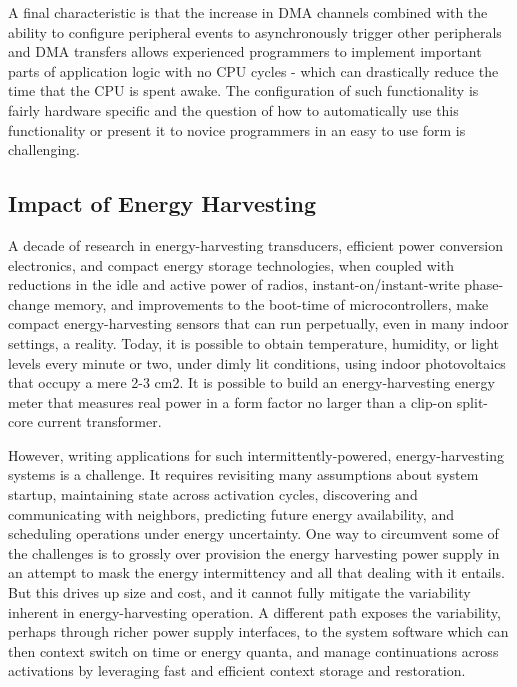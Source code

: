 A final characteristic is that the increase in DMA channels combined with the
ability to configure peripheral events to asynchronously trigger other
peripherals and DMA transfers allows experienced programmers to implement
important parts of application logic with no CPU cycles - which can
drastically reduce the time that the CPU is spent awake. The configuration of
such functionality is fairly hardware specific and the question of how to
automatically use this functionality or present it to novice programmers in an
easy to use form is challenging.

\subsection{Impact of Energy Harvesting}

A decade of research in energy-harvesting transducers, efficient power
conversion electronics, and compact energy storage technologies, when coupled
with reductions in the idle and active power of radios,
instant-on/instant-write phase-change memory, and improvements to the
boot-time of microcontrollers, make compact energy-harvesting sensors that can
run perpetually, even in many indoor settings, a reality.  Today, it is
possible to obtain temperature, humidity, or light levels every minute or two,
under dimly lit conditions, using indoor photovoltaics that occupy a mere 2-3
cm2.  It is possible to build an energy-harvesting energy meter that measures
real power in a form factor no larger than a clip-on split-core current
transformer.

However, writing applications for such intermittently-powered,
energy-harvesting systems is a challenge.  It requires revisiting many
assumptions about system startup, maintaining state across activation cycles,
discovering and communicating with neighbors, predicting future energy
availability, and scheduling operations under energy uncertainty.  One way to
circumvent some of the challenges is to grossly over provision the energy
harvesting power supply in an attempt to mask the energy intermittency and all
that dealing with it entails.  But this drives up size and cost, and it cannot
fully mitigate the variability inherent in energy-harvesting operation.  A
different path exposes the variability, perhaps through richer power supply
interfaces, to the system software which can then context switch on time or
energy quanta, and manage continuations across activations by leveraging fast
and efficient context storage and restoration.

